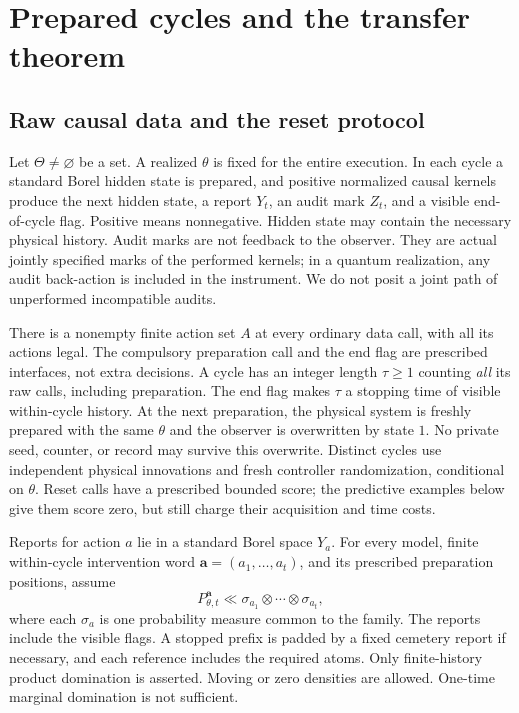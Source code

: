 \section{Prepared cycles and the transfer theorem}\label{sec:experiments}
\subsection{Raw causal data and the reset protocol}
Let $\Theta\ne\varnothing$ be a set. A realized $\theta$ is fixed for the entire execution. In each cycle a standard Borel hidden state is prepared, and positive normalized causal kernels produce the next hidden state, a report $Y_t$, an audit mark $Z_t$, and a visible end-of-cycle flag. Positive means nonnegative. Hidden state may contain the necessary physical history. Audit marks are not feedback to the observer. They are actual jointly specified marks of the performed kernels; in a quantum realization, any audit back-action is included in the instrument. We do not posit a joint path of unperformed incompatible audits.

There is a nonempty finite action set $A$ at every ordinary data call, with all its actions legal. The compulsory preparation call and the end flag are prescribed interfaces, not extra decisions. A cycle has an integer length $\tau\ge1$ counting \emph{all} its raw calls, including preparation. The end flag makes $\tau$ a stopping time of visible within-cycle history. At the next preparation, the physical system is freshly prepared with the same $\theta$ and the observer is overwritten by state $1$. No private seed, counter, or record may survive this overwrite. Distinct cycles use independent physical innovations and fresh controller randomization, conditional on $\theta$. Reset calls have a prescribed bounded score; the predictive examples below give them score zero, but still charge their acquisition and time costs.

Reports for action $a$ lie in a standard Borel space $Y_a$. For every model, finite within-cycle intervention word $\mathbf a=(a_1,\ldots,a_t)$, and its prescribed preparation positions, assume
\begin{equation}\label{eq:product}
 P_{\theta,t}^{\mathbf a}\ll \sigma_{a_1}\otimes\cdots\otimes\sigma_{a_t},
\end{equation}
where each $\sigma_a$ is one probability measure common to the family. The reports include the visible flags. A stopped prefix is padded by a fixed cemetery report if necessary, and each reference includes the required atoms. Only finite-history product domination is asserted. Moving or zero densities are allowed. One-time marginal domination is not sufficient.

